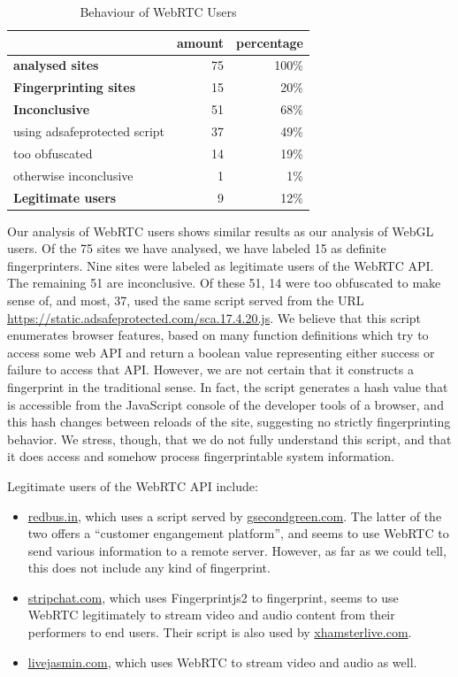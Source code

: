 \documentclass[
    fontsize=12pt,
    headings=small,
    parskip=half,
    bibliography=totoc,
    numbers=noenddot,
    open=any
    ]{scrreprt}
\begin{document}
\begin{table}
\centering
\caption{Behaviour of WebRTC Users}
\begin{tabular}{l r r}
    \toprule
    & amount & percentage \\
    \midrule
    \textbf{analysed sites} & 75 & 100\% \\
    \midrule
    \textbf{Fingerprinting sites} & 15 & 20\% \\
    \midrule
    \textbf{Inconclusive} & 51 & 68\% \\
    using adsafeprotected script & 37 & 49\% \\
    too obfuscated & 14 & 19\% \\
    otherwise inconclusive & 1 & 1\% \\
    \midrule
    \textbf{Legitimate users} & 9 & 12\% \\
    \bottomrule
\end{tabular}
\label{table:webrtc_users}
\end{table}

Our analysis of WebRTC users shows similar results as our analysis of WebGL users.
Of the 75 sites we have analysed, we have labeled 15 as definite fingerprinters.
Nine sites were labeled as legitimate users of the WebRTC API. The remaining 51 are inconclusive.
Of these 51, 14 were too obfuscated to make sense of, and most, 37, used the same script
served from the URL \url{https://static.adsafeprotected.com/sca.17.4.20.js}.
We believe that this script enumerates browser features, based on many function definitions
which try to access some web API and return a boolean value representing either success
or failure to access that API.
However, we are not certain that it constructs a fingerprint in the traditional sense.
In fact, the script generates a hash value that is accessible from the JavaScript console
of the developer tools of a browser, and this hash changes between reloads of the site,
suggesting no strictly fingerprinting behavior. We stress, though, that we do not fully
understand this script, and that it does access and somehow process fingerprintable
system information.

Legitimate users of the WebRTC API include:
\begin{itemize}
    \item \url{redbus.in}, which uses a script served by \url{gsecondgreen.com}. The latter of the two offers a ``customer engangement platform'', and seems to use WebRTC to send various information to a remote server. However, as far as we could tell, this does not include any kind of fingerprint.
    \item \url{stripchat.com}, which uses Fingerprintjs2 to fingerprint, seems to use WebRTC legitimately to stream video and audio content from their performers to end users. Their script is also used by \url{xhamsterlive.com}.
    \item \url{livejasmin.com}, which uses WebRTC to stream video and audio as well.
\end{itemize}
\end{document}
